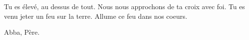 

Tu es élevé, au dessus de tout. Nous nous approchons de ta croix avec foi.
Tu es venu jeter un feu sur la terre. Allume ce feu dans nos coeurs.

Abba, Père.


